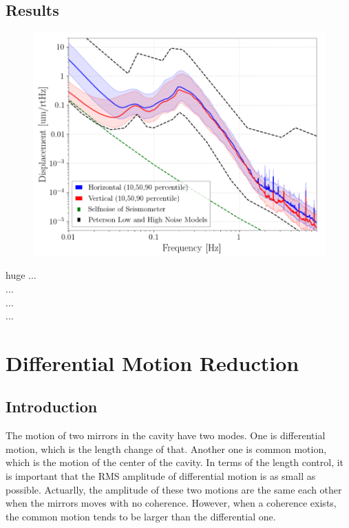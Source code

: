 \subsection{Results}
\begin{figure}[h]
  \begin{center}   
    \includegraphics[width=16.0cm]{./img_chap3/img313.png}
    \caption{}\label{img:img317}
  \end{center}
\end{figure}

huge
...\\
...\\
...\\
...\\

\section{Differential Motion Reduction}
\subsection{Introduction}
The motion of two mirrors in the cavity have two modes. One is differential motion, which is the length change of that. Another one is common motion, which is the motion of the center of the cavity. In terms of the length control, it is important that the RMS amplitude of differential motion is as small as possible. Actuarlly, the amplitude of these two motions are the same each other when the mirrors moves with no coherence. However, when a coherence exists, the common motion tends to be larger than the differential one. 

